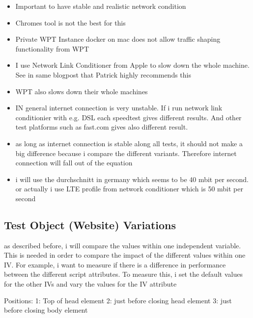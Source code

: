 \begin{itemize}
\item Important to have stable and realistic network condition
\item Chromes tool is not the best for this %
\item Private WPT Instance docker on mac does not allow traffic shaping functionality from WPT
\item I use Network Link Conditioner from Apple to slow down the whole machine. See in same blogpost that Patrick highly recommends this
\item WPT also slows down their whole machines %
\item IN general internet connection is very unstable. If i run network link conditionier with e.g. DSL each speedtest gives different results. And other test platforms such as fast.com gives also different result.
\item as long as internet connection is stable along all tests, it should not make a big difference because i compare the different variants. Therefore internet connection will fall out of the equation
\item i will use the durchschnitt in germany which seems to be 40 mbit per second. or actually i use LTE profile from network conditioner which is 50 mbit per second 
\end{itemize}








\subsection{Test Object (Website) Variations}

as described before, i will compare the values within one independent variable. 
This is needed in order to compare the impact of the different values within one IV.
For example, i want to measure if there is a difference in performance between the different script attributes. To measure this, i set the default values for the other IVs and vary the values for the IV attribute

Positions:
1: Top of head element
2: just before closing head element
3: just before closing body element


